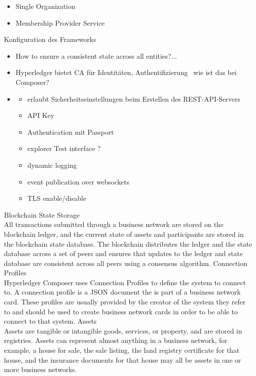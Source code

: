         \begin{itemize}[noitemsep]
            \item Single Organization 
            \item Membership Provider Service
        \end{itemize}
        
        Konfiguration des Frameworks
        \begin{itemize}[noitemsep]
            \item How to ensure a consistent state across all entities?...
            \item Hyperledger bietet CA für Identitäten, Authentifizierung \textrightarrow\ wie ist das bei Composer?
            \item \begin{itemize}
                \item erlaubt Sicherheitseinstellungen beim Erstellen des REST-API-Servers
                \item API Key
                \item Authentication mit Passport
                \item explorer Test interface ?
                \item dynamic logging
                \item event publication over websockets
                \item TLS enable/\-disable
            \end{itemize}
        \end{itemize}
    
Blockchain State Storage\\
All transactions submitted through a business network are stored on the blockchain ledger, and the current state of assets and participants are stored in the blockchain state database. The blockchain distributes the ledger and the state database across a set of peers and ensures that updates to the ledger and state database are consistent across all peers using a consensus algorithm.
\medskip
Connection Profiles\\
Hyperledger Composer uses Connection Profiles to define the system to connect to. A connection profile is a JSON document the is part of a business network card. These profiles are usually provided by the creator of the system they refer to and should be used to create business network cards in order to be able to connect to that system.
\medskip
Assets\\
Assets are tangible or intangible goods, services, or property, and are stored in registries. Assets can represent almost anything in a business network, for example, a house for sale, the sale listing, the land registry certificate for that house, and the insurance documents for that house may all be assets in one or more business networks.

